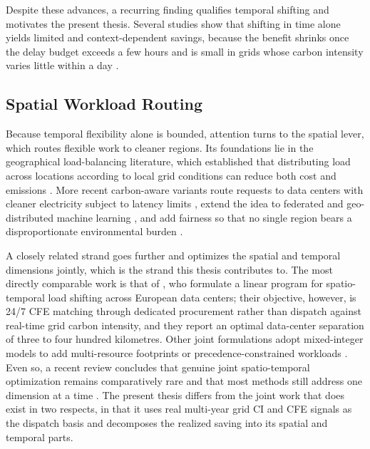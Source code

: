 Despite these advances, a recurring finding qualifies temporal shifting and motivates the present thesis. Several studies show that shifting in time alone yields limited and context-dependent savings, because the benefit shrinks once the delay budget exceeds a few hours and is small in grids whose carbon intensity varies little within a day \citep{sukprasert2024limitations, wiesner2021letswait}.

\subsection{Spatial Workload Routing}
\label{sec:lr-spatial}

Because temporal flexibility alone is bounded, attention turns to the spatial lever, which routes flexible work to cleaner regions. Its foundations lie in the geographical load-balancing literature, which established that distributing load across locations according to local grid conditions can reduce both cost and emissions \citep{liu2012, lindberg2022geographic}. More recent carbon-aware variants route requests to data centers with cleaner electricity subject to latency limits \citep{souza2023casper}, extend the idea to federated and geo-distributed machine learning \citep{bian2024cafe, li2025llm}, and add fairness so that no single region bears a disproportionate environmental burden \citep{li2024equitable}.

A closely related strand goes further and optimizes the spatial and temporal dimensions jointly, which is the strand this thesis contributes to. The most directly comparable work is that of \citet{riepin2024spatiotemporal}, who formulate a linear program for spatio-temporal load shifting across European data centers; their objective, however, is 24/7 CFE matching through dedicated procurement rather than dispatch against real-time grid carbon intensity, and they report an optimal data-center separation of three to four hundred kilometres. Other joint formulations adopt mixed-integer models to add multi-resource footprints \citep{attenni2024shifting} or precedence-constrained workloads \citep{lechowicz2025pcaps}. Even so, a recent review concludes that genuine joint spatio-temporal optimization remains comparatively rare and that most methods still address one dimension at a time \citep{asadov2025review}. The present thesis differs from the joint work that does exist in two respects, in that it uses real multi-year grid CI and CFE signals as the dispatch basis and decomposes the realized saving into its spatial and temporal parts.

